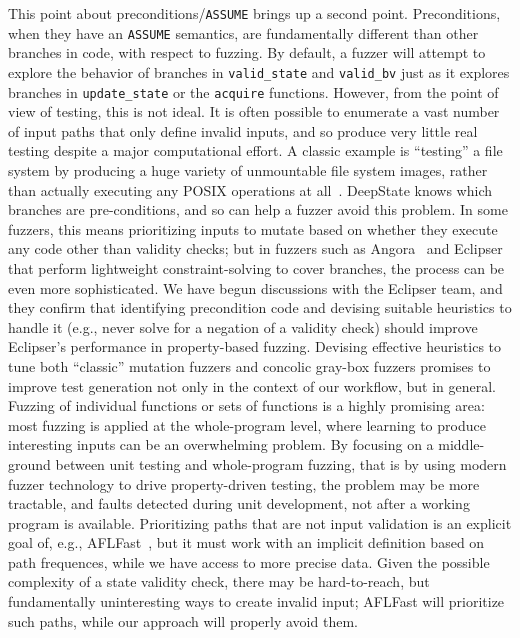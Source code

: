   This point about preconditions/{\tt ASSUME} brings up a second point.  Preconditions, when they have an {\tt ASSUME} semantics, are fundamentally different than other branches in code, with respect to fuzzing.  By default, a fuzzer will attempt to explore the behavior of branches in {\tt valid\_state} and {\tt valid\_bv} just as it explores branches in {\tt update\_state} or the {\tt acquire} functions.  However, from the point of view of testing, this is not ideal.  It is often possible to enumerate a vast number of input paths that only define invalid inputs, and so produce very little real testing despite a major computational effort.  A classic example is ``testing'' a file system by producing a huge variety of unmountable file system images, rather than actually executing any POSIX operations at all~\cite{CFV08,AMAI}.  DeepState knows which branches are pre-conditions, and so can help a fuzzer avoid this problem.  In some fuzzers, this means prioritizing inputs to mutate based on whether they execute any code other than validity checks; but in fuzzers such as Angora~\cite{angora} and Eclipser~\cite{eclipser} that perform lightweight constraint-solving to cover branches, the process can be even more sophisticated.  We have begun discussions with the Eclipser team, and they confirm that identifying precondition code and devising suitable heuristics to handle it (e.g., never solve for a negation of a validity check) should improve Eclipser's performance in property-based fuzzing.  Devising effective heuristics to tune both ``classic'' mutation fuzzers and concolic gray-box fuzzers promises to improve test generation not only in the context of our workflow, but in general.  Fuzzing of individual functions or sets of functions is a highly promising area: most fuzzing is applied at the whole-program level, where learning to produce interesting inputs can be an overwhelming problem.  By focusing on a middle-ground between unit testing and whole-program fuzzing, that is by using modern fuzzer technology to drive property-driven testing, the problem may be more tractable, and faults detected during unit development, not after a working program is available.  Prioritizing paths that are not input validation is an explicit goal of, e.g., AFLFast~\cite{aflfast}, but it must work with an implicit definition based on path frequences, while we have access to more precise data.  Given the possible complexity of a state validity check, there may be hard-to-reach, but fundamentally uninteresting ways to create invalid input; AFLFast will prioritize such paths, while our approach will properly avoid them.

